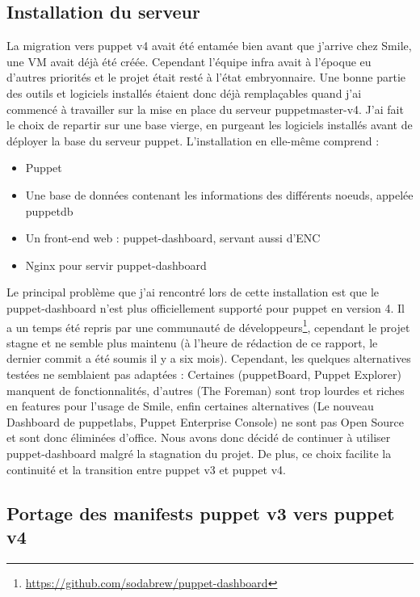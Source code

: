 \documentclass[14 pt]{extreport}
\begin{document}
\subsection{Installation du serveur}

La migration vers puppet v4 avait été entamée bien avant que j'arrive chez Smile, une VM avait déjà été créée. Cependant l'équipe infra avait à l'époque eu d'autres priorités et le projet était resté à l'état embryonnaire. Une bonne partie des outils et logiciels installés étaient donc déjà remplaçables quand j'ai commencé à travailler sur la mise en place du serveur puppetmaster-v4. J'ai fait le choix de repartir sur une base vierge, en purgeant les logiciels installés avant de déployer la base du serveur puppet. L'installation en elle-même comprend :

\begin{itemize}
	\item Puppet
	\item Une base de données contenant les informations des différents noeuds, appelée puppetdb
	\item Un front-end web : puppet-dashboard, servant aussi d'ENC
	\item Nginx pour servir puppet-dashboard
\end{itemize}

Le principal problème que j'ai rencontré lors de cette installation est que le puppet-dashboard n'est plus officiellement supporté pour puppet en version 4. Il a un temps été repris par une communauté de développeurs\footnote{\url{https://github.com/sodabrew/puppet-dashboard}}, cependant le projet stagne et ne semble plus maintenu (à l'heure de rédaction de ce rapport, le dernier commit a été soumis il y a six mois). Cependant, les quelques alternatives testées ne semblaient pas adaptées : Certaines (puppetBoard, Puppet Explorer) manquent de fonctionnalités, d'autres (The Foreman) sont trop lourdes et riches en features pour l'usage de Smile, enfin certaines alternatives (Le nouveau Dashboard de puppetlabs, Puppet Enterprise Console) ne sont pas Open Source et sont donc éliminées d'office. Nous avons donc décidé de continuer à utiliser puppet-dashboard malgré la stagnation du projet. De plus, ce choix facilite la continuité et la transition entre puppet v3 et puppet v4.

\subsection{Portage des manifests puppet v3 vers puppet v4}
\end{document}
